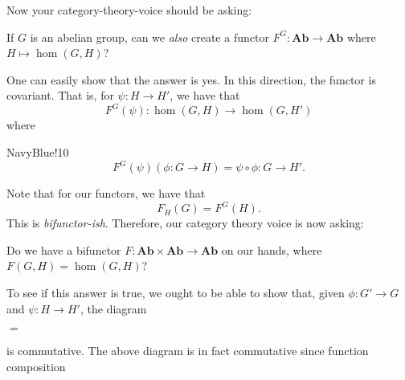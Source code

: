 Now your category-theory-voice should be asking: 
\begin{center}
    \begin{minipage}{0.8\textwidth}
        \textcolor{NavyBlue}{If $G$ is an abelian group, can we \emph{also} create 
        a functor $F^G: \textbf{Ab} \to \textbf{Ab}$ where $H \mapsto \hom(G, H)$?}
    \end{minipage}
\end{center}
One can easily show that the answer is yes. In this direction, the functor is covariant. That 
is, for $\psi: H \to H'$, we have that 
\[
    F^G(\psi): \hom(G, H) \to \hom(G, H')
\]
where 
\begin{statement}{NavyBlue!10}
\[
    F^G(\psi)(\phi: G \to H) = \psi \circ \phi: G \to H'.
\]
\end{statement}
Note that for our functors, we have that
\[
    F_H(G) = F^G(H).
\]
This is \emph{bifunctor-ish}. Therefore, our category theory voice is now 
asking: 
\begin{center}
    \begin{minipage}{0.8\textwidth}
        \textcolor{NavyBlue}{Do we have a bifunctor 
        $F: \textbf{Ab}\times \textbf{Ab} \to \textbf{Ab}$ on our hands, where 
        $F(G, H) = \hom(G, H)$? }
    \end{minipage}
\end{center}
To see if this answer is true, we ought to be able to show that, given 
$\phi: G' \to G$ and $\psi: H \to H'$, the diagram 
\begin{center}
    $=$
\end{center} 
is commutative. The above diagram is in fact commutative since function composition 
